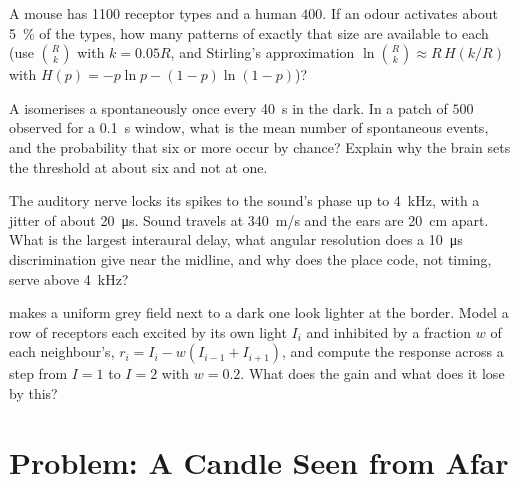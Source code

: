 \begin{exercise}[$\star\star$]\label{exo:b3:sensory-systems:9}
A mouse has \num{1100} receptor types and a human $400$. If an odour
activates about \qty{5}{\%} of the types, how many patterns of exactly
that size are available to each (use $\binom{R}{k}$ with $k = 0.05R$,
and Stirling's approximation $\ln\binom{R}{k} \approx R\,H(k/R)$ with
$H(p) = -p\ln p - (1-p)\ln(1-p)$)?
\end{exercise}

\begin{exercise}[$\star\star\star$]\label{exo:b3:sensory-systems:10}
A  isomerises a  spontaneously once every \qty{40}{s} in
the dark. In a patch of $500$  observed for a \qty{0.1}{s} window,
what is the mean number of spontaneous events, and the probability
that six or more occur by chance? Explain why the brain sets the
threshold at about six and not at one.
\end{exercise}

\begin{exercise}[$\star\star\star$]\label{exo:b3:sensory-systems:11}
The auditory nerve locks its spikes to the sound's phase up to
\qty{4}{kHz}, with a jitter of about \qty{20}{\micro s}. Sound travels
at \qty{340}{m/s} and the ears are \qty{20}{cm} apart. What is the
largest interaural delay, what angular resolution does a
\qty{10}{\micro s} discrimination give near the midline, and why does
the place code, not timing, serve above \qty{4}{kHz}?
\end{exercise}

\begin{exercise}[$\star\star\star$]\label{exo:b3:sensory-systems:12}
 makes a uniform grey field next to a dark one look
lighter at the border. Model a row of receptors each excited by its own
light $I_{i}$ and inhibited by a fraction $w$ of each neighbour's,
$r_{i} = I_{i} - w(I_{i-1} + I_{i+1})$, and compute the response across
a step from $I = 1$ to $I = 2$ with $w = 0.2$. What does the  gain
and what does it lose by this?
\end{exercise}

\section{Problem: A Candle Seen from Afar}


